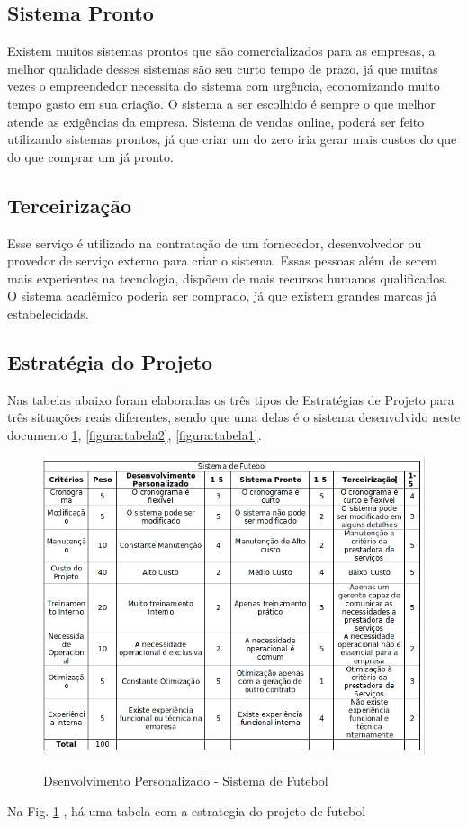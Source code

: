 \subsection{Sistema Pronto}
Existem muitos sistemas prontos que são comercializados para as empresas, a melhor qualidade desses sistemas são seu curto tempo de prazo, já que muitas vezes o empreendedor necessita do sistema com urgência, economizando muito tempo gasto em sua criação. O sistema a ser escolhido é sempre o que melhor atende as exigências da empresa.
Sistema de vendas online, poderá ser feito utilizando sistemas prontos, já que criar um do zero iria gerar mais custos do que do que comprar um já pronto.
\subsection{Terceirização}
 Esse serviço é utilizado na contratação de um fornecedor, desenvolvedor ou provedor de serviço externo para criar o sistema. Essas pessoas além de serem mais experientes na tecnologia, dispõem de mais recursos humanos qualificados.
 O sistema acadêmico poderia ser comprado, já que existem grandes marcas já estabelecidads.
\subsection{Estratégia do Projeto}
 Nas tabelas abaixo foram elaboradas os três tipos de Estratégias de Projeto para três situações reais diferentes, sendo que uma delas é o sistema desenvolvido neste documento \ref{figura:tabela3}, \ref{figura:tabela2}, \ref{figura:tabela1}.
 

                \begin{figure}[H]
                 \caption{Dsenvolvimento Personalizado - Sistema de Futebol}
               \centering %
                 \includegraphics[width=15cm]{analisedeProjeto/tabela3} %
                \label{figura:tabela3}
                \end{figure}
                Na Fig. \ref{figura:tabela3} , há uma tabela com a estrategia do projeto de futebol
                
